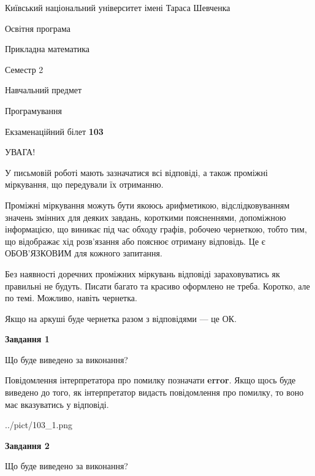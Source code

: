 \documentclass[12pt, ukrainian]{article}
\begin{document}
{{\begin {small}\par
{ \center  Київський національний університет імені Тараса Шевченка \par}
{\parbox {5 cm}{Освітня програма \hfill}{\parbox {7 cm}{Прикладна математика \hfill}}\parbox {6 cm}{\hfill Семестр 2}}\par
{\parbox {5 cm} {Навчальний предмет \hfill}\parbox {7 cm}{Програмування \hfill}\parbox {6cm}{\hfill}\par}\vspace{-7pt} \end{small}}{\center Екзаменаційний білет \No \textbf
{ 103 }\par}}
{
\begin {large}
УВАГА!

У письмовій роботі мають зазначатися всі відповіді, а також проміжні міркування, що передували їх отриманню.

Проміжні міркування можуть бути якоюсь арифметикою, відслідковуванням зна\-чень змінних для деяких завдань,
короткими поясненнями, допоміжною інформацією, що виникає під час обходу графів, робочею чернеткою,
тобто тим, що відображає хід розв’язання або пояснює отриману відповідь.
Це є ОБОВ’ЯЗКОВИМ для кожного запитання.

Без наявності доречних проміжних міркувань відповіді зараховуватись як правиль\-ні не будуть.
Писати багато та красиво оформлено не треба. Коротко, але по темі. Можли\-во, навіть чернетка.

Якщо на аркуші буде чернетка разом з відповідями --- це ОК.

\newpage

{\begin {center}\textbf{Завдання 1}\end {center}}\par
Що буде виведено за виконання?

Повідомлення інтерпретатора про помилку позначати \textbf{error}.
Якщо щось буде виведено до того, як інтерпретатор видасть повідомлення про помилку, 
то воно має вказуватись у відповіді. \par


\begin{center}
	{../pict/103_1.png}
\end{center}
\newpage

{\begin {center}\textbf{Завдання 2}\end {center}}\par
Що буде виведено за виконання?


\end{large}}
\end{document}

